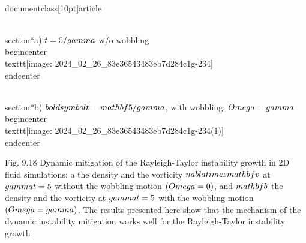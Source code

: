 \\documentclass[10pt]{article}
\begin{document}
{{{{{{\\section*{a) $t=5 / \\gamma$ w/o wobbling}
\\begin{center}
\\texttt{[image: 2024\_02\_26\_83e36543483eb7d284c1g-234]}
\\end{center}

\\section*{b) $\\boldsymbol{t}=\\mathbf{5} / \\gamma$, with wobbling: $\\Omega=\\gamma$}
\\begin{center}
\\texttt{[image: 2024\_02\_26\_83e36543483eb7d284c1g-234(1)]}
\\end{center}

Fig. 9.18 Dynamic mitigation of the Rayleigh-Taylor instability growth in 2D fluid simulations: a the density and the vorticity $\\nabla \\times \\mathbf{v}$ at $\\gamma t=5$ without the wobbling motion $(\\Omega=0)$, and $\\mathbf{b}$ the density and the vorticity at $\\gamma t=5$ with the wobbling motion $(\\Omega=\\gamma)$. The results presented here show that the mechanism of the dynamic instability mitigation works well for the Rayleigh-Taylor instability growth

}}}}}}
\end{document}
